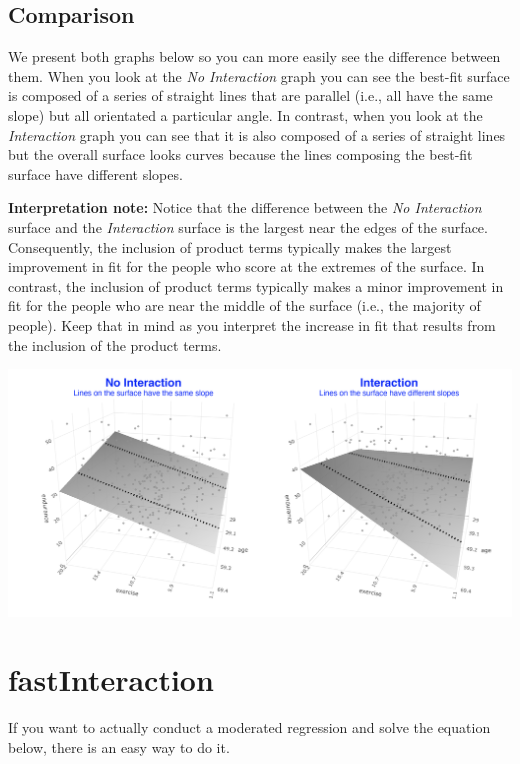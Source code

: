 \documentclass[
]{krantz}
\begin{document}
\hypertarget{comparison}{%
\subsection{Comparison}\label{comparison}}

We present both graphs below so you can more easily see the difference between them. When you look at the \emph{No Interaction} graph you can see the best-fit surface is composed of a series of straight lines that are parallel (i.e., all have the same slope) but all orientated a particular angle. In contrast, when you look at the \emph{Interaction} graph you can see that it is also composed of a series of straight lines but the overall surface looks curves because the lines composing the best-fit surface have different slopes.

\textbf{Interpretation note:} Notice that the difference between the \emph{No Interaction} surface and the \emph{Interaction} surface is the largest near the edges of the surface. Consequently, the inclusion of product terms typically makes the largest improvement in fit for the people who score at the extremes of the surface. In contrast, the inclusion of product terms typically makes a minor improvement in fit for the people who are near the middle of the surface (i.e., the majority of people). Keep that in mind as you interpret the increase in fit that results from the inclusion of the product terms.

\includegraphics[width=0.9\linewidth]{ch_mmr/images/mmr_both}

\hypertarget{fastinteraction}{%
\section{fastInteraction}\label{fastinteraction}}

If you want to actually conduct a moderated regression and solve the equation below, there is an easy way to do it.
\end{document}
